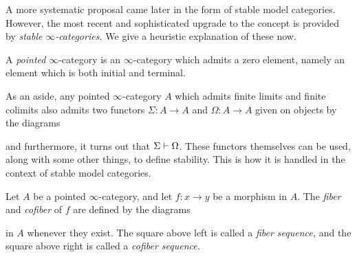 A more systematic proposal came later in the form of stable model categories. However, the most recent and sophisticated upgrade to the concept is provided by \emph{stable} \(\infty\)\emph{-categories.}
We give a heuristic explanation of these now.
\begin{definition}
	A \emph{pointed} \(\infty\)-category is an \(\infty\)-category which admits a zero element, namely an element which is both initial and terminal.
\end{definition}
\begin{remark}
	As an aside, any pointed \(\infty\)-category \(A\) which admits finite limits and finite colimits also admits two functors \(\Sigma\!:A\to A\) and \(\Omega\!:A\to A\) given on objects by the diagrams
	\begin{center}
	\quad
	\end{center}
	and furthermore, it turns out that \(\Sigma\vdash\Omega\). These functors themselves can be used, along with some other things, to define stability. This is how it is handled
	in the context of stable model categories.
\end{remark}

\begin{definition}
	Let \(A\) be a pointed \(\infty\)-category, and let \(f\!:x\to y\) be a morphism in \(A\). The \emph{fiber} and \emph{cofiber} of \(f\) are defined by
	the diagrams
	\begin{center}
	\quad
	\end{center}
	in \(A\) whenever they exist. The square above left is called a \emph{fiber sequence,} and the square above right is called a \emph{cofiber sequence.}
\end{definition}

